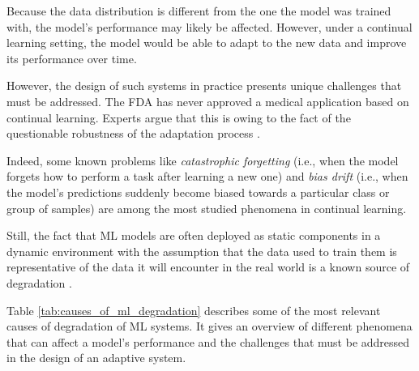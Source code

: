 \documentclass[../main.tex]{subfiles}
\begin{document}
    Because the data distribution is different from the one the model was trained with, the model's performance may likely be affected. However, under a continual learning setting, the model would be able to adapt to the new data and improve its performance over time. 

    
    However, the design of such systems in practice presents unique challenges that must be addressed. The FDA has never approved a medical application based on continual learning. Experts argue that this is owing to the fact of the questionable robustness of the adaptation process \cite{vokingerContinualLearningMedical2021}. 
    
    Indeed, some known problems like \textit{catastrophic forgetting} (i.e., when the model forgets how to perform a task after learning a new one) and \textit{bias drift} (i.e., when the model's predictions suddenly become biased towards a particular class or group of samples) are among the most studied phenomena in continual learning.
    
    
    Still, the fact that ML models are often deployed as static components in a dynamic environment with the assumption that the data used to train them is representative of the data it will encounter in the real world is a known source of degradation \cite{vokingerContinualLearningMedical2021}.

    Table \ref{tab:causes_of_ml_degradation} describes some of the most relevant causes of degradation of ML systems. It gives an overview of different phenomena that can affect a model's performance and the challenges that must be addressed in the design of an adaptive system.
\end{document}
